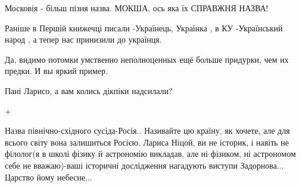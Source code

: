 \begin{itemize}
Московія - більш пізня назва. МОКША, ось яка їх СПРАВЖНЯ НАЗВА!


 
Раніше в Першій книжечці писали -Українець, Українка , в КУ -Український народ , а тепер нас принизили до українця.

 
Да, видимо потомки умственно неполноценных ещё больше придурки, чем их предки. И вы яркий пример.

 
Пані Ларисо, а вам колись дікпіки надсилали?

 
+

 

Назва північно-східного сусіда-Росія.. Називайте цю країну, як хочете, але для
всього світу вона залишиться Росією. Лариса Ніцой, ви не історик, і навіть не
філолог(я в школі фізику й астрономію викладав, але ні фізиком, ні астрономом
себе не вважаю)-ваші історичні дослідження нагадують виступи Задорнова...
Царство йому небесне...



\end{itemize}


